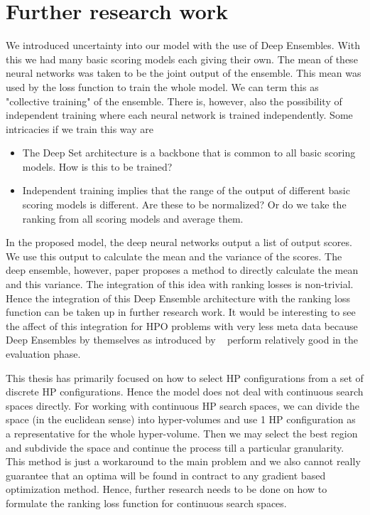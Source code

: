 \documentclass[12pt, twoside, ngerman]{report}
\begin{document}
\section{Further research work}

We introduced uncertainty into our model with the use of Deep Ensembles. 
With this we had many basic scoring models each giving their own.
The mean of these neural networks was taken to be the joint output of the
ensemble.
This mean was used by the loss function to train the whole model.
We can term this as "collective training" of the ensemble.
There is,  however,  also the possibility of independent training where each neural network is trained independently.
Some intricacies if we train this way are
\begin{itemize}
\item The Deep Set architecture is a backbone that is common to all basic scoring models.  How is this to be trained?
\item Independent training implies that the range of the output of different basic scoring models is different. 
Are these to be normalized? Or do we take the ranking from all scoring models and average them.
\end{itemize}

In the proposed model,  the deep neural networks output a list of output scores. 
We use this output to calculate the mean and the variance of the scores.
The deep ensemble, however, paper proposes a method to directly calculate the mean and this variance.
The integration of this idea with ranking losses is non-trivial.
Hence the integration of this Deep Ensemble architecture with the ranking loss function can be taken up in further research work.
It would be interesting to see the affect of this integration for HPO problems with very less meta data because Deep Ensembles by themselves as introduced by ~\cite{DeepEnsemblePaper} perform relatively good in the evaluation phase.

This thesis has primarily focused on how to select HP configurations from a set of discrete HP configurations.
Hence the model does not deal with continuous search spaces directly.
For working with continuous HP search spaces,  we can divide the space  (in the euclidean sense) into hyper-volumes and use 1 HP configuration as a representative for the whole hyper-volume.
Then we may select the best region and subdivide the space and continue the process till a particular granularity.
This method is just a workaround to the main problem and we also cannot really guarantee that an optima will be found in contract to any gradient based optimization method.
Hence,  further research needs to be done on how to formulate the ranking loss function for continuous search spaces.
\end{document}
